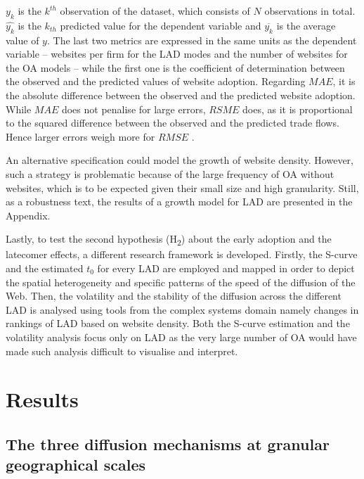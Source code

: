 \documentclass[
  authoryear,
  preprint,
  3p]{elsarticle}
\begin{document}
\noindent \(y_{k}\) is the \(k^{th}\) observation of the dataset, which
consists of \(N\) observations in total. \(\hat{y_{k}}\) is the
\(k_{th}\) predicted value for the dependent variable and
\(\overline{y_{k}}\) is the average value of \(y\). The last two metrics
are expressed in the same units as the dependent variable -- websites
per firm for the LAD modes and the number of websites for the OA models
-- while the first one is the coefficient of determination between the
observed and the predicted values of website adoption. Regarding
\(MAE\), it is the absolute difference between the observed and the
predicted website adoption. While \(MAE\) does not penalise for large
errors, \(RSME\) does, as it is proportional to the squared difference
between the observed and the predicted trade flows. Hence larger errors
weigh more for \(RMSE\) \citep{pontius2008components}.

An alternative specification could model the growth of website density.
However, such a strategy is problematic because of the large frequency
of OA without websites, which is to be expected given their small size
and high granularity. Still, as a robustness text, the results of a
growth model for LAD are presented in the Appendix.

Lastly, to test the second hypothesis (H\textsubscript{2}) about the
early adoption and the latecomer effects, a different research framework
is developed. Firstly, the S-curve and the estimated \(t_0\) for every
LAD are employed and mapped in order to depict the spatial heterogeneity
and specific patterns of the speed of the diffusion of the Web. Then,
the volatility and the stability of the diffusion across the different
LAD is analysed using tools from the complex systems domain
\citep{Batty2009} namely changes in rankings of LAD based on website
density. Both the S-curve estimation and the volatility analysis focus
only on LAD as the very large number of OA would have made such analysis
difficult to visualise and interpret.

\section{Results}\label{sec-results}

\subsection{The three diffusion mechanisms at granular geographical
scales}\label{the-three-diffusion-mechanisms-at-granular-geographical-scales}
\end{document}
